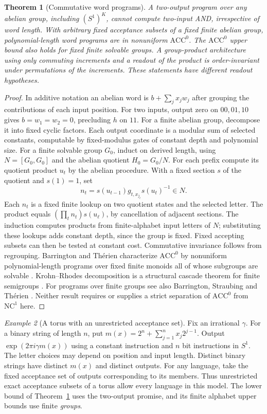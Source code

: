 \documentclass[11pt,reqno]{amsart}
\newtheorem{theorem}{Theorem}[section]
\theoremstyle{definition}
\theoremstyle{remark}
\newtheorem{example}[theorem]{Example}
\numberwithin{equation}{section}
\begin{document}
\begin{theorem}[Commutative word programs]\label{m6:abelian}
A two-output program over any abelian group, including
\((S^1)^K\), cannot compute two-input AND, irrespective of
word length. With arbitrary fixed acceptance subsets of a
fixed finite abelian group, polynomial-length word programs
are in nonuniform \(\mathrm{ACC}^0\). The \(\mathrm{ACC}^0\)
upper bound also holds for fixed finite solvable groups.
A group-product architecture using only commuting increments
and a readout of the product is order-invariant under
permutations of the increments. These statements have
different readout hypotheses.
\end{theorem}
\begin{proof}
In additive notation an abelian word is \(b+\sum_j x_jw_j\)
after grouping the contributions of each input position.
For two inputs, output zero on \(00,01,10\) gives
\(b=w_1=w_2=0\), precluding \(h\) on \(11\).
For a finite abelian group, decompose it into fixed cyclic
factors. Each output coordinate is a modular sum of selected
constants, computable by fixed-modulus gates of constant
depth and polynomial size. For a finite solvable group \(G_0\),
induct on derived length, using \(N=[G_0,G_0]\) and the abelian
quotient \(H_0=G_0/N\). For each prefix compute its quotient
product \(u_t\) by the abelian procedure. With a fixed section
\(s\) of the quotient and \(s(1)=1\), set
\[
 n_t=s(u_{t-1})g_{t,x_{j_t}}s(u_t)^{-1}\in N .
\]
Each \(n_t\) is a fixed finite lookup on two quotient states
and the selected letter. The product equals
\((\prod_t n_t)s(u_\ell)\), by cancellation of adjacent
sections. The induction computes products from finite-alphabet
input letters of \(N\); substituting these lookups adds constant
depth, since the group is fixed. Fixed accepting subsets can
then be tested at constant cost. Commutative invariance follows
from regrouping. Barrington and Th\'erien characterize
\(\mathrm{ACC}^0\) by nonuniform polynomial-length programs
over fixed finite monoids all of whose subgroups are solvable
\cite{m6:BT}. Krohn--Rhodes decomposition is a structural
cascade theorem for finite semigroups \cite{m6:KR}.
For programs over finite groups see also Barrington, Straubing and Th\'erien \cite{m6:BST}.
Neither result requires or supplies a strict separation of
\(\mathrm{ACC}^0\) from \(\mathrm{NC}^1\) here.
\end{proof}

\begin{example}[A torus with an unrestricted acceptance set]\label{m6:torus-refutation}
Fix an irrational \(\gamma\). For a binary string of length \(n\),
put \(m(x)=2^n+\sum_{j=1}^n x_j2^{j-1}\). Output
\(\exp(2\pi i\gamma m(x))\) using a constant instruction
and \(n\) bit instructions in \(S^1\).
The letter choices may depend on position and input length.
Distinct binary strings have distinct \(m(x)\) and distinct
outputs. For any language, take the fixed acceptance set
of outputs corresponding to its members. Thus unrestricted
exact acceptance subsets of a torus allow every language
in this model. The lower bound of Theorem~\ref{m6:abelian}
uses the two-output promise, and its finite alphabet upper
bounds use finite \emph{groups}.
\end{example}
\end{document}
